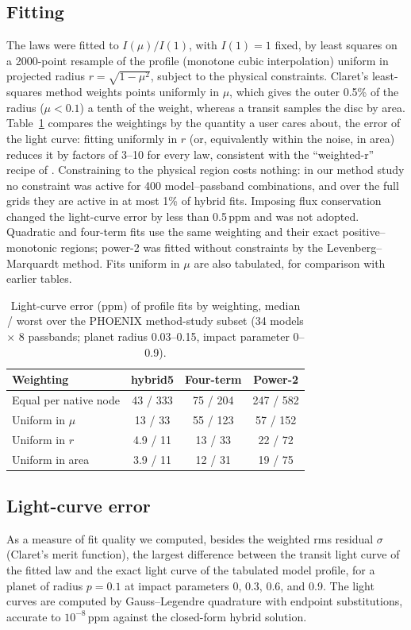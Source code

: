 \documentclass{aa}
\newcommand{\ppm}{\,\textrm{ppm}}
\begin{document}
\subsection{Fitting}
The laws were fitted to $I(\mu)/I(1)$, with $I(1)=1$ fixed, by least squares on
a 2000-point resample of the profile (monotone cubic interpolation) uniform in
projected radius $r=\sqrt{1-\mu^2}$, subject to the physical constraints.
Claret's least-squares method weights points uniformly in $\mu$, which gives the
outer 0.5\% of the radius ($\mu<0.1$) a tenth of the weight, whereas a transit
samples the disc by area. Table~\ref{tab:weighting} compares the weightings by
the quantity a user cares about, the error of the light curve: fitting uniformly
in $r$ (or, equivalently within the noise, in area) reduces it by factors of
3--10 for every law, consistent with the ``weighted-r'' recipe of
\citet{morello2020}. Constraining to the physical region costs nothing: in our
method study no constraint was active for 400 model--passband combinations, and
over the full grids they are active in at most 1\% of hybrid fits. Imposing flux
conservation \citep{claretbloemen2011} changed the light-curve error by less than
0.5\ppm{} and was not adopted. Quadratic and four-term fits use the same
weighting and their exact positive--monotonic regions; power-2 was fitted
without constraints by the Levenberg--Marquardt method. Fits uniform in $\mu$ are
also tabulated, for comparison with earlier tables.

\begin{table}
\caption{Light-curve error (ppm) of profile fits by weighting, median / worst
over the PHOENIX method-study subset (34 models $\times$ 8 passbands; planet
radius 0.03--0.15, impact parameter 0--0.9).}
\label{tab:weighting}
\centering
\begin{tabular}{lccc}
\hline\hline
Weighting & hybrid5 & Four-term & Power-2\\
\hline
Equal per native node & 43 / 333 & 75 / 204 & 247 / 582\\
Uniform in $\mu$ & 13 / 33 & 55 / 123 & 57 / 152\\
Uniform in $r$ & 4.9 / 11 & 13 / 33 & 22 / 72\\
Uniform in area & 3.9 / 11 & 12 / 31 & 19 / 75\\
\hline
\end{tabular}
\end{table}

\subsection{Light-curve error}
As a measure of fit quality we computed, besides the weighted rms residual
$\sigma$ (Claret's merit function), the largest difference between the transit
light curve of the fitted law and the exact light curve of the tabulated model
profile, for a planet of radius $p=0.1$ at impact parameters 0, 0.3, 0.6, and
0.9. The light curves are computed by Gauss--Legendre quadrature with endpoint
substitutions, accurate to $10^{-8}$\ppm{} against the closed-form hybrid
solution.
\end{document}
